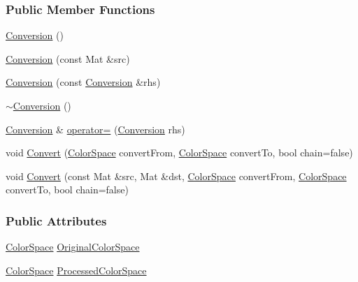 \subsubsection*{Public Member Functions}
\begin{DoxyCompactItemize}
\item 
\hyperlink{class_vision_1_1_conversion_ade9665873e1ebd5e07f458d9dcf10996}{Conversion} ()
\item 
\hyperlink{class_vision_1_1_conversion_a9d881d8a0fc29f26afb84422fd8599f4}{Conversion} (const Mat \&src)
\item 
\hyperlink{class_vision_1_1_conversion_ada85747609dcedb2a117f06fd5c033ce}{Conversion} (const \hyperlink{class_vision_1_1_conversion}{Conversion} \&rhs)
\item 
\hyperlink{class_vision_1_1_conversion_a9a22cb622c0e847fa4635e7194c76d4d}{$\sim$\+Conversion} ()
\item 
\hyperlink{class_vision_1_1_conversion}{Conversion} \& \hyperlink{class_vision_1_1_conversion_ac1a6958a4d331108ad61f346f06319c7}{operator=} (\hyperlink{class_vision_1_1_conversion}{Conversion} rhs)
\item 
void \hyperlink{class_vision_1_1_conversion_ac78b687a5b6cdf4c0ae812b5d76b13fc}{Convert} (\hyperlink{class_vision_1_1_conversion_a0a21d4ccbb013185f1974d35ec86e388}{Color\+Space} convert\+From, \hyperlink{class_vision_1_1_conversion_a0a21d4ccbb013185f1974d35ec86e388}{Color\+Space} convert\+To, bool chain=false)
\item 
void \hyperlink{class_vision_1_1_conversion_a7795d9d544e89e672acff2747b2218f0}{Convert} (const Mat \&src, Mat \&dst, \hyperlink{class_vision_1_1_conversion_a0a21d4ccbb013185f1974d35ec86e388}{Color\+Space} convert\+From, \hyperlink{class_vision_1_1_conversion_a0a21d4ccbb013185f1974d35ec86e388}{Color\+Space} convert\+To, bool chain=false)
\end{DoxyCompactItemize}
\subsubsection*{Public Attributes}
\begin{DoxyCompactItemize}
\item 
\hyperlink{class_vision_1_1_conversion_a0a21d4ccbb013185f1974d35ec86e388}{Color\+Space} \hyperlink{class_vision_1_1_conversion_a3fd4bac8a8d6788b6a1886916c5464b4}{Original\+Color\+Space}
\item 
\hyperlink{class_vision_1_1_conversion_a0a21d4ccbb013185f1974d35ec86e388}{Color\+Space} \hyperlink{class_vision_1_1_conversion_a57337750cb60b9ff7ed269c184d1fda7}{Processed\+Color\+Space}
\end{DoxyCompactItemize}
